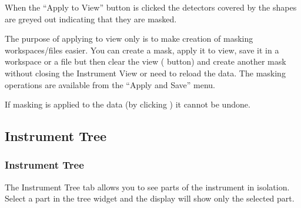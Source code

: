\documentclass[letterpaper,10pt,english,openany]{sphinxmanual}
\begin{document}
\begin{figure}[H]
\centering

\noindent{}
\end{figure}

When the “Apply to View” button is clicked the detectors covered by the
shapes are greyed out indicating that they are masked.

\begin{figure}[H]
\centering

\noindent{}
\end{figure}

The purpose of applying to view only is to make creation of masking
workspaces/files easier. You can create a mask, apply it to view, save
it in a workspace or a file but then clear the view
( button) and create another mask without closing
the Instrument View or need to reload the data. The masking operations
are available from the “Apply and Save” menu.

\begin{figure}[H]
\centering

\noindent{}
\end{figure}

If masking is applied to the data (by clicking )
it cannot be undone.




\subsection{Instrument Tree}
\label{\detokenize{mantid_basic_course/connecting_data_to_instruments/05_instrument_tree:instrument-tree}}\label{\detokenize{mantid_basic_course/connecting_data_to_instruments/05_instrument_tree:id1}}\label{\detokenize{mantid_basic_course/connecting_data_to_instruments/05_instrument_tree::doc}}

\subsubsection{Instrument Tree}
\label{\detokenize{mantid_basic_course/connecting_data_to_instruments/05_instrument_tree:id2}}
The Instrument Tree tab allows you to see parts of the instrument in
isolation. Select a part in the tree widget and the display will show
only the selected part.
\end{document}
